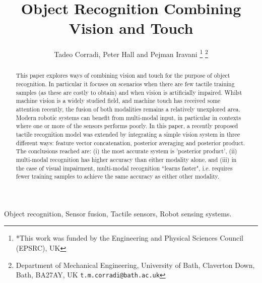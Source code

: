 \documentclass[9pt,technote]{IEEEtran}  %
\title{Object Recognition Combining Vision and Touch}
\author{Tadeo Corradi, Peter Hall and Pejman Iravani%
	\thanks{*This work was funded by the Engineering and Physical Sciences Council (EPSRC), UK}%
	\thanks{Department of Mechanical Engineering, University of Bath, Claverton Down, Bath, BA27AY, UK
		{\tt\small t.m.corradi@bath.ac.uk}}%
}
\begin{document}
\maketitle

\begin{abstract}
This paper explores ways of combining vision and touch for the purpose of object recognition. In particular it focuses on scenarios when there are few tactile training samples (as these are costly to obtain) and when vision is artificially impaired.
Whilst machine vision is a widely studied field, and machine touch has received some attention recently, the fusion of both modalities remains a relatively unexplored area.
Modern robotic systems can benefit from multi-modal input, in particular in contexts where one or more of the sensors performs poorly. 
In this paper, a recently proposed tactile recognition model was extended by integrating a simple vision system in three different ways: feature vector concatenation, posterior averaging and posterior product.
The conclusions reached are: (i) the most accurate system is 'posterior product', (ii) multi-modal recognition has higher accuracy than either modality alone, and (iii) in the case of visual impairment, multi-modal recognition ``learns faster", i.e. requires fewer training samples to achieve the same accuracy as either other modality.
\end{abstract}

\begin{IEEEkeywords}
	Object recognition, Sensor fusion, Tactile sensors, Robot sensing systems.
\end{IEEEkeywords}
\end{document}

